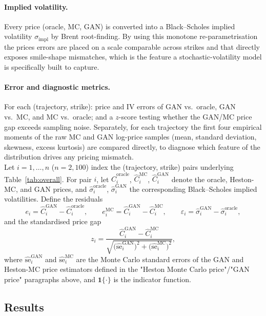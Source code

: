 \paragraph{Implied volatility.} Every price (oracle, MC, GAN) is
converted into a Black--Scholes implied volatility $\sigma_{\text{impl}}$
by Brent root-finding. By using this monotone re-parametrisation the prices errors are placed
 on a scale comparable across strikes and that directly exposes smile-shape mismatches, which is the
feature a stochastic-volatility model is specifically built to capture.

\paragraph{Error and diagnostic metrics.} For each (trajectory, strike):
price and IV errors of GAN vs.\ oracle, GAN vs.\ MC, and MC vs.\ oracle;
and a $z$-score
testing whether the GAN/MC price gap exceeds sampling noise. Separately,
for each trajectory the first four empirical moments of the raw MC and
GAN log-price samples (mean, standard deviation, skewness, excess
kurtosis) are compared directly, to diagnose which feature of the
distribution drives any pricing mismatch.\\

Let $i=1,\dots,n$ ($n=2{,}100$) index the
(trajectory, strike) pairs underlying Table~\ref{tab:overall}. For pair
$i$, let $\hat C_i^{\text{oracle}}$, $\hat C_i^{\text{MC}}$,
$\hat C_i^{\text{GAN}}$ denote the oracle, Heston-MC, and GAN prices, and
$\hat\sigma_i^{\text{oracle}}$, $\hat\sigma_i^{\text{GAN}}$ the
corresponding Black--Scholes implied volatilities. Define the residuals
\[
e_i = \hat C_i^{\text{GAN}}-\hat C_i^{\text{oracle}}, \qquad
e_i^{\text{MC}} = \hat C_i^{\text{GAN}}-\hat C_i^{\text{MC}}, \qquad
\varepsilon_i = \hat\sigma_i^{\text{GAN}}-\hat\sigma_i^{\text{oracle}},
\]
and the standardised price gap
\[
z_i = \frac{\hat C_i^{\text{GAN}}-\hat C_i^{\text{MC}}}
{\sqrt{\big(\widehat{\text{se}}_i^{\text{GAN}}\big)^2+\big(\widehat{\text{se}}_i^{\text{MC}}\big)^2}},
\]
where $\widehat{\text{se}}_i^{\text{GAN}}$ and $\widehat{\text{se}}_i^{\text{MC}}$
are the Monte Carlo standard errors of the GAN and Heston-MC price
estimators defined in the "Heston Monte Carlo price"/"GAN price"
paragraphs above, and $\mathbf 1\{\cdot\}$ is the indicator function.

\subsection{Results}

